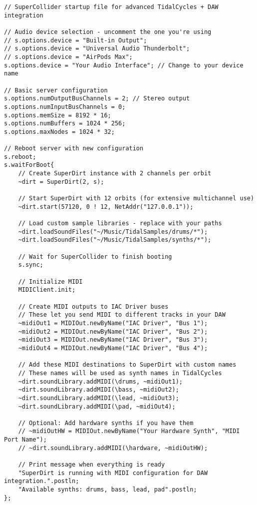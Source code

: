 \documentclass[11pt,a4paper]{article}
\begin{document}
\begin{lstlisting}[style=supercollider]
// SuperCollider startup file for advanced TidalCycles + DAW integration

// Audio device selection - uncomment the one you're using
// s.options.device = "Built-in Output";
// s.options.device = "Universal Audio Thunderbolt";
// s.options.device = "AirPods Max";
s.options.device = "Your Audio Interface"; // Change to your device name

// Basic server configuration
s.options.numOutputBusChannels = 2; // Stereo output
s.options.numInputBusChannels = 0;
s.options.memSize = 8192 * 16;
s.options.numBuffers = 1024 * 256;
s.options.maxNodes = 1024 * 32;

// Reboot server with new configuration
s.reboot;
s.waitForBoot{
    // Create SuperDirt instance with 2 channels per orbit
    ~dirt = SuperDirt(2, s);
    
    // Start SuperDirt with 12 orbits (for extensive multichannel use)
    ~dirt.start(57120, 0 ! 12, NetAddr("127.0.0.1"));
    
    // Load custom sample libraries - replace with your paths
    ~dirt.loadSoundFiles("~/Music/TidalSamples/drums/*");
    ~dirt.loadSoundFiles("~/Music/TidalSamples/synths/*");
    
    // Wait for SuperCollider to finish booting
    s.sync;
    
    // Initialize MIDI
    MIDIClient.init;
    
    // Create MIDI outputs to IAC Driver buses
    // These let you send MIDI to different tracks in your DAW
    ~midiOut1 = MIDIOut.newByName("IAC Driver", "Bus 1");
    ~midiOut2 = MIDIOut.newByName("IAC Driver", "Bus 2");
    ~midiOut3 = MIDIOut.newByName("IAC Driver", "Bus 3");
    ~midiOut4 = MIDIOut.newByName("IAC Driver", "Bus 4");
    
    // Add these MIDI destinations to SuperDirt with custom names
    // These names will be used as synth names in TidalCycles
    ~dirt.soundLibrary.addMIDI(\drums, ~midiOut1);
    ~dirt.soundLibrary.addMIDI(\bass, ~midiOut2);
    ~dirt.soundLibrary.addMIDI(\lead, ~midiOut3);
    ~dirt.soundLibrary.addMIDI(\pad, ~midiOut4);
    
    // Optional: Add hardware synths if you have them
    // ~midiOutHW = MIDIOut.newByName("Your Hardware Synth", "MIDI Port Name");
    // ~dirt.soundLibrary.addMIDI(\hardware, ~midiOutHW);
    
    // Print message when everything is ready
    "SuperDirt is running with MIDI configuration for DAW integration.".postln;
    "Available synths: drums, bass, lead, pad".postln;
};
\end{lstlisting}
\end{document}
